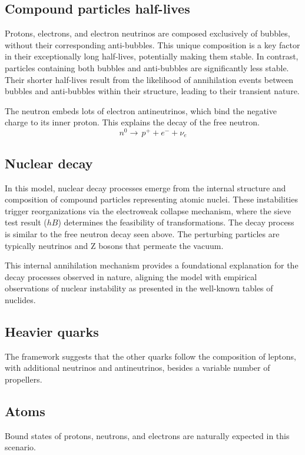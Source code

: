 \documentclass[12pt,english]{article}
\begin{document}
\subsection{Compound particles half-lives}
Protons, electrons, and electron neutrinos are composed exclusively of bubbles, without their corresponding anti-bubbles. This unique composition is a key factor in their exceptionally long half-lives, potentially making them stable. In contrast, particles containing both bubbles and anti-bubbles are significantly less stable. Their shorter half-lives result from the likelihood of annihilation events between bubbles and anti-bubbles within their structure, leading to their transient nature.

The neutron embeds lots of electron antineutrinos, which bind the negative charge to its inner proton. This explains the decay of the free neutron.
\[
n^0\rightarrow\,p^{+}+e^{-}+\nu_e
\]

\subsection{Nuclear decay}

In this model, nuclear decay processes emerge from the internal structure and composition of compound particles representing atomic nuclei. These instabilities trigger reorganizations via the electroweak collapse mechanism, where the sieve test result ($hB$) determines the feasibility of transformations. The decay process is similar to the free neutron decay seen above. The perturbing particles are typically neutrinos and Z bosons that permeate the vacuum.

This internal annihilation mechanism provides a foundational explanation for the decay processes observed in nature, aligning the model with empirical observations of nuclear instability as presented in the well-known tables of nuclides.

\subsection{Heavier quarks}
The framework suggests that the other quarks follow the composition of leptons, with additional neutrinos and antineutrinos, besides a variable number of propellers.

\subsection{Atoms}
Bound states of protons, neutrons, and electrons are naturally expected in this scenario.
\end{document}
